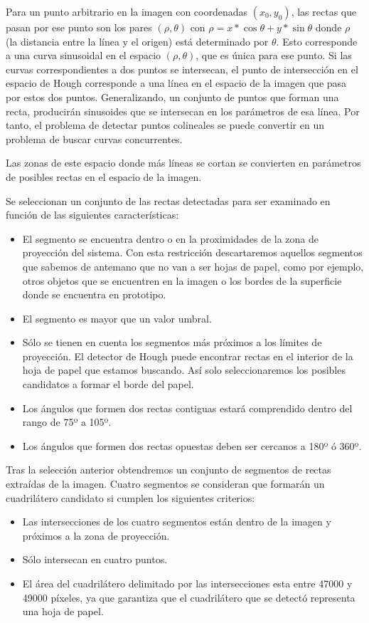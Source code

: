 Para un punto arbitrario en la imagen con coordenadas $(x_0,y_0)$, las rectas que pasan por ese punto
son los pares  $(\rho,\theta)$ con  $\rho=x*\cos \theta + y * \sin \theta$ donde $\rho$ (la
distancia entre la línea y el origen) está determinado por $\theta$. Esto corresponde a una curva
sinusoidal en el espacio  $(\rho,\theta)$, que es única para ese punto. Si las curvas
correspondientes  a dos puntos se intersecan, el punto de intersección en el espacio de Hough
corresponde  a una línea en el espacio de la imagen que pasa por estos dos puntos. Generalizando, un
conjunto de puntos que forman una recta, producirán sinusoides que se intersecan en los parámetros
de esa línea. Por tanto, el problema de detectar puntos colineales se puede convertir en un problema
de buscar curvas concurrentes.

Las zonas de este espacio donde más líneas se cortan se convierten en parámetros de posibles rectas
en el espacio de la imagen.

Se seleccionan un conjunto de las rectas detectadas para ser examinado en función de las siguientes características:

\begin{itemize}
\item El segmento se encuentra dentro o en la proximidades de la zona de proyección del
  sistema. Con esta restricción descartaremos aquellos segmentos que sabemos de antemano que no van
  a ser hojas de papel, como por ejemplo, otros objetos que se encuentren en la imagen o los bordes
  de la superficie donde se encuentra en prototipo.
\item El segmento es mayor que un valor umbral.
\item Sólo se tienen en cuenta los segmentos más próximos a los límites de proyección. El detector
  de Hough puede encontrar rectas en el interior de la hoja de papel que estamos buscando. Así solo
  seleccionaremos los posibles candidatos a formar el borde del papel.
\item Los ángulos que formen dos rectas contiguas estará comprendido dentro del rango de 75º a 105º.
\item Los ángulos que formen dos rectas opuestas deben ser cercanos a 180º ó 360º.
\end{itemize}

Tras la selección anterior obtendremos un conjunto de segmentos de rectas extraídas de la
imagen. Cuatro segmentos se consideran que formarán un cuadrilátero candidato si cumplen los
siguientes criterios:
\begin{itemize}
\item Las intersecciones de los cuatro segmentos están dentro de la imagen y próximos a la zona de
  proyección.
\item Sólo intersecan en cuatro puntos.
\item El área del cuadrilátero delimitado por las intersecciones esta entre 47000 y 49000 píxeles,
  ya que garantiza que el cuadrilátero que se detectó representa una hoja de papel.
\end{itemize}

